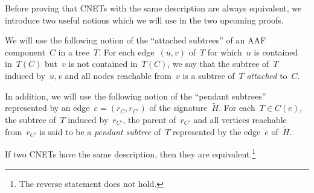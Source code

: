 {Before proving that CNETs with the same description are always equivalent, we introduce two useful notions which we will use in the two upcoming proofs.}

We will use the following notion of the {``attached subtrees''} of an AAF component~$C$ in a tree~$T$. For each edge~$(u,v)$ of~$T$ for which~$u$ is contained in~$T(C)$ but~$v$ is not contained in~$T(C)$, we say that the subtree of~$T$ induced by~$u,v$ and all nodes reachable from~$v$ is {a subtree of~$T$ \emph{attached} to~$C$.}
  
In addition, we will use the following notion of the ``pendant subtrees'' represented by an edge~{$e=(r_C,r_{C'})$ of the signature~$\tilde H$. For each~$T\in C(e)$, the subtree of~$T$ induced by~$r_{C'}$, the parent of~$r_{C'}$ and all vertices reachable from~$r_{C'}$ is} said to be a \emph{pendant subtree} of~$T$ represented by the edge~$e$ of~$\tilde H$.

\begin{lem}
  \label{lem:unique-network}
  If two CNETs have the same description, then they are equivalent.\footnote{The reverse statement does not hold.}
\end{lem}

